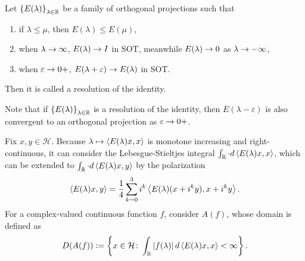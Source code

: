 \documentclass[a4paper,12pt]{article}
\begin{document}
\begin{defn}
    Let $\left\{E(\lambda)\right\}_{\lambda \in \mathbb{R}}$ be a family of orthogonal projections such that
    \begin{enumerate}[label=(\arabic{*})]
        \item if $\lambda \leq \mu$, then $E(\lambda) \leq E(\mu)$,
        \item when $\lambda \rightarrow \infty$, $E(\lambda) \rightarrow I$ in SOT, meanwhile $E(\lambda) \rightarrow 0$ as $\lambda \rightarrow -\infty$,
        \item when $\varepsilon \rightarrow 0+$, $E(\lambda + \varepsilon) \rightarrow E(\lambda)$ in SOT.
    \end{enumerate}
    Then it is called a resolution of the identity.
\end{defn}
\begin{rmk}
    Note that if $\left\{E(\lambda)\right\}_{\lambda \in \mathbb{R}}$ is a resolution of the identity, then $E(\lambda - \varepsilon)$ is also convergent to an orthogonal projection as $\varepsilon \rightarrow 0+$.
\end{rmk}

Fix $x,y \in \mathcal{H}$. Because $\lambda \mapsto \left\langle E(\lambda)x, x \right\rangle$ is monotone increasing and right-continuous, it can consider the Lebesgue-Stieltjes integral $\int_{\mathbb{R}} \cdot d\left\langle E(\lambda)x,x \right\rangle$, which can be extended to $\int_{\mathbb{R}} \cdot d\left\langle E(\lambda)x,y \right\rangle$ by the polarization 
\begin{equation*}
    \left\langle E(\lambda)x,y \right\rangle = \frac{1}{4}\sum_{k=0}^3 i^k \left\langle E(\lambda)(x+i^ky),x+i^ky \right\rangle.
\end{equation*}
For a complex-valued continuous function $f$, consider $A(f)$, whose domain is defined as
\begin{equation*}
    D(A(f)) \vcentcolon= \left\{x\in\mathcal{H} \colon \int_{\mathbb{R}}\left\lvert f(\lambda)\right\lvert d\left\langle E(\lambda)x,x \right\rangle < \infty\right\}.
\end{equation*}
\end{document}
